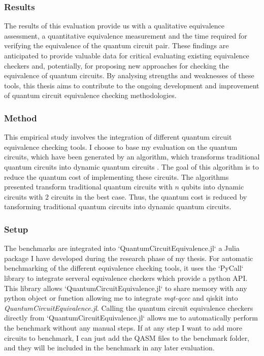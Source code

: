 \documentclass[11pt]{article}
\theoremstyle{definition}
\theoremstyle{definition}
\begin{document}
\subsubsection{Results}
\label{sec:org54cf13f}
The results of this evaluation provide us with a qualitative equivalence
assessment, a quantitative equivalence measurement and the time required
for verifying the equivalence of the quantum circuit pair. These findings
are anticipated to provide valuable data for critical evaluating existing
equivalence checkers and, potentially, for proposing new approaches for
checking the equivalence of quantum circuits. By analysing strengths and
weaknesses of these tools, this thesis aims to contribute to the ongoing
development and improvement of quantum circuit equivalence checking
methodologies.


\subsubsection{Method}
\label{sec:org288613f}
This empirical study involves the integration of different quantum circuit
equivalence checking tools.
I choose to base my evaluation on the quantum circuits, which have been
generated by an algorithm, which transforms traditional quantum circuits into
dynamic quantum circuits \cite{koleExtendingDesignSpace2023}. The goal of
this algorithm is to reduce the quantum cost of implementing these circuits.
The algorithms presented transform traditional quantum circuits with \(n\)
qubits into dynamic circuits with \(2\) circuits in the best case. Thus, the
quantum cost is reduced by tansforming traditional quantum circuits into
dynamic quantum circuits.


\subsubsection{Setup}
\label{sec:orgbdae092}

The benchmarks are integrated into `QuantumCircuitEquivalence.jl` a Julia
package I have developed during the research phase of my thesis. For
automatic benchmarking of the different equivalence checking tools, it uses
the `PyCall` library to integrate serveral equivalence checkers which provide a
python API. This library allows `QuantumCircuitEquivalence.jl` to share
memory with any python object or function allowing me to integrate
\emph{mqt-qcec} and qiskit into \emph{QuantumCircuitEquivalence.jl}. Calling the
quantum circuit equivalence checkers directly from
`QuantumCircuitEquivalence.jl` allows me to automatically perform the
 benchmark without any manual steps. If at any step I want to add more
 circuits to benchmark, I can just add the QASM files to the benchmark
 folder, and they will be included in the benchmark in any later evaluation.
\end{document}
